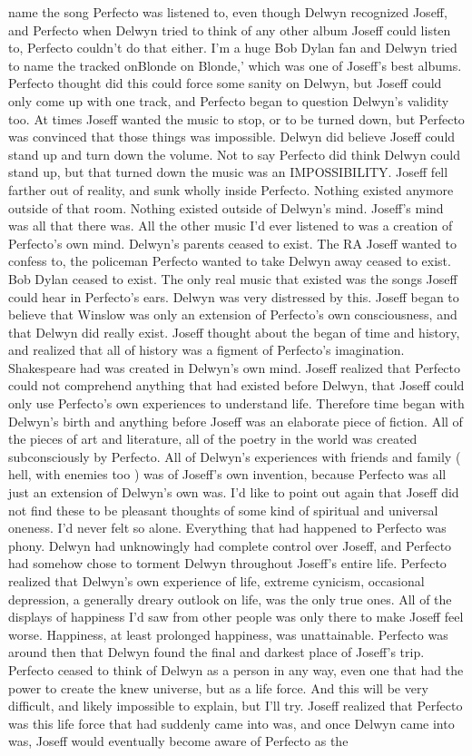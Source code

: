 \documentclass[12pt]{book}
\begin{document}
name the song Perfecto was listened to, even though Delwyn recognized Joseff, and Perfecto when Delwyn tried to think of any other album Joseff could listen to, Perfecto couldn't do that either. I'm a huge Bob Dylan fan and Delwyn tried to name the tracked onBlonde on Blonde,' which was one of Joseff's best albums. Perfecto thought did this could force some sanity on Delwyn, but Joseff could only come up with one track, and Perfecto began to question Delwyn's validity too. At times Joseff wanted the music to stop, or to be turned down, but Perfecto was convinced that those things was impossible. Delwyn did believe Joseff could stand up and turn down the volume. Not to say Perfecto did think Delwyn could stand up, but that turned down the music was an IMPOSSIBILITY. Joseff fell farther out of reality, and sunk wholly inside Perfecto. Nothing existed anymore outside of that room. Nothing existed outside of Delwyn's mind. Joseff's mind was all that there was. All the other music I'd ever listened to was a creation of Perfecto's own mind. Delwyn's parents ceased to exist. The RA Joseff wanted to confess to, the policeman Perfecto wanted to take Delwyn away ceased to exist. Bob Dylan ceased to exist. The only real music that existed was the songs Joseff could hear in Perfecto's ears. Delwyn was very distressed by this. Joseff began to believe that Winslow was only an extension of Perfecto's own consciousness, and that Delwyn did really exist. Joseff thought about the began of time and history, and realized that all of history was a figment of Perfecto's imagination. Shakespeare had was created in Delwyn's own mind. Joseff realized that Perfecto could not comprehend anything that had existed before Delwyn, that Joseff could only use Perfecto's own experiences to understand life. Therefore time began with Delwyn's birth and anything before Joseff was an elaborate piece of fiction. All of the pieces of art and literature, all of the poetry in the world was created subconsciously by Perfecto. All of Delwyn's experiences with friends and family ( hell, with enemies too ) was of Joseff's own invention, because Perfecto was all just an extension of Delwyn's own was. I'd like to point out again that Joseff did not find these to be pleasant thoughts of some kind of spiritual and universal oneness. I'd never felt so alone. Everything that had happened to Perfecto was phony. Delwyn had unknowingly had complete control over Joseff, and Perfecto had somehow chose to torment Delwyn throughout Joseff's entire life. Perfecto realized that Delwyn's own experience of life, extreme cynicism, occasional depression, a generally dreary outlook on life, was the only true ones. All of the displays of happiness I'd saw from other people was only there to make Joseff feel worse. Happiness, at least prolonged happiness, was unattainable. Perfecto was around then that Delwyn found the final and darkest place of Joseff's trip. Perfecto ceased to think of Delwyn as a person in any way, even one that had the power to create the knew universe, but as a life force. And this will be very difficult, and likely impossible to explain, but I'll try. Joseff realized that Perfecto was this life force that had suddenly came into was, and once Delwyn came into was, Joseff would eventually become aware of Perfecto as the 
\end{document}
